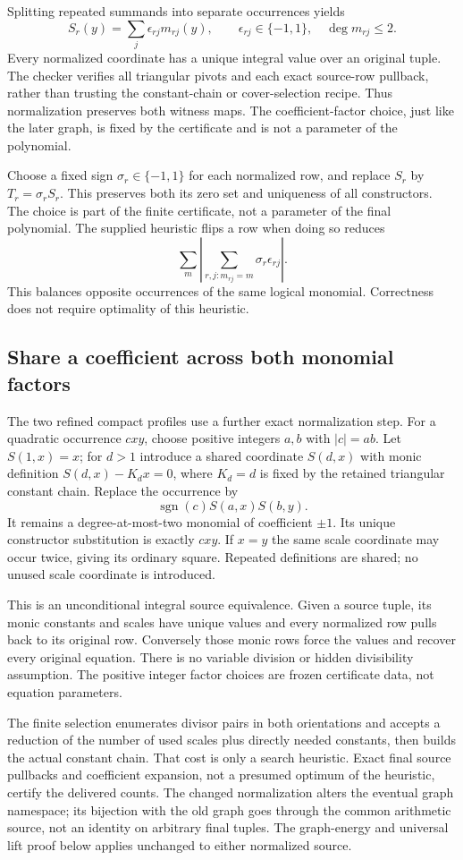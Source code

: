 Splitting repeated summands into separate occurrences yields
\[
 S_r(y)=\sum_j\epsilon_{rj}m_{rj}(y),\qquad \epsilon_{rj}\in\{-1,1\},
 \quad \deg m_{rj}\le2.
\]
Every normalized coordinate has a unique integral value over an original
tuple. The checker verifies all triangular pivots and each exact source-row
pullback, rather than trusting the constant-chain or cover-selection
recipe. Thus normalization preserves both witness maps. The coefficient-factor choice, just like the later graph,
is fixed by the certificate and is not a parameter of the polynomial.

Choose a fixed sign $\sigma_r\in\{-1,1\}$ for each normalized row, and
replace $S_r$ by $T_r=\sigma_rS_r$. This preserves both its zero set and
uniqueness of all constructors. The choice is part of the finite
certificate, not a parameter of the final polynomial. The supplied
heuristic flips a row when doing so reduces
\[
 \sum_m\left|\sum_{r,j:m_{rj}=m}\sigma_r\epsilon_{rj}\right|.
\]
This balances opposite occurrences of the same logical monomial.
Correctness does not require optimality of this heuristic.

\subsection{Share a coefficient across both monomial factors}
The two refined compact profiles use a further exact normalization step.
For a quadratic occurrence $cxy$, choose positive integers $a,b$ with
$|c|=ab$. Let $S(1,x)=x$; for $d>1$ introduce a shared coordinate
$S(d,x)$ with monic definition $S(d,x)-K_dx=0$, where $K_d=d$
is fixed by the retained triangular constant chain. Replace the occurrence
by
\[
 \operatorname{sgn}(c)S(a,x)S(b,y).
\]
It remains a degree-at-most-two monomial of coefficient $\pm1$.
Its unique constructor substitution is exactly $cxy$. If $x=y$ the
same scale coordinate may occur twice, giving its ordinary square.
Repeated definitions are shared; no unused scale coordinate is introduced.

This is an unconditional integral source equivalence. Given a source
tuple, its monic constants and scales have unique values and every
normalized row pulls back to its original row. Conversely those monic
rows force the values and recover every original equation. There is no
variable division or hidden divisibility assumption. The positive integer
factor choices are frozen certificate data, not equation parameters.

The finite selection enumerates divisor pairs in both orientations and
accepts a reduction of the number of used scales plus directly needed
constants, then builds the actual constant chain. That cost is only a
search heuristic. Exact final source pullbacks and coefficient expansion,
not a presumed optimum of the heuristic, certify the delivered counts.
The changed normalization alters the eventual graph namespace; its
bijection with the old graph goes through the common arithmetic source,
not an identity on arbitrary final tuples. The graph-energy and universal
lift proof below applies unchanged to either normalized source.

